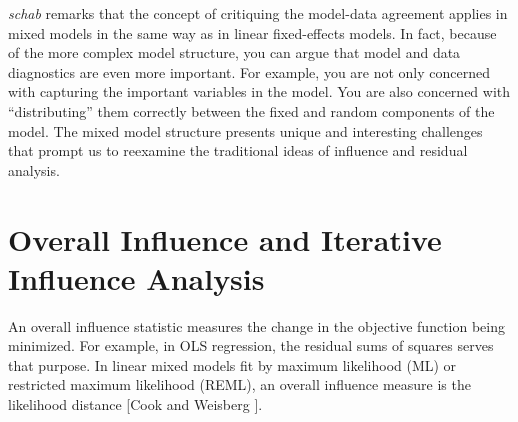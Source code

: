 \documentclass[Main.tex]{subfiles}
\begin{document}
		\emph{schab} remarks that the concept of critiquing the model-data agreement applies in mixed models in the same way as in linear
		fixed-effects models. In fact, because of the more complex model structure, you can argue that model and
		data diagnostics are even more important. For example, you are not only concerned with capturing the
		important variables in the model. You are also concerned with ``distributing” them correctly between the
		fixed and random components of the model. The mixed model structure presents unique and interesting
		challenges that prompt us to reexamine the traditional ideas of influence and residual analysis.
		
		
\newpage
\section{Overall Influence and Iterative Influence Analysis}
			An overall influence statistic measures the change in the objective function being minimized. For example, in
			OLS regression, the residual sums of squares serves that purpose. In linear mixed models fit by
			 maximum likelihood (ML) or  restricted maximum likelihood (REML), an overall influence measure is the  likelihood distance [Cook and Weisberg ].
				
	
\end{document}
